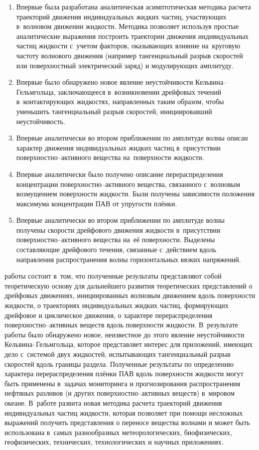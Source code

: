 {\novelty}
\begin{enumerate}
  \item Впервые была разработана аналитическая асимптотическая методика расчета траекторий движения индивидуальных жидких частиц, участвующих в~волновом движении жидкости. Методика позволяет используя простые аналитические выражения построить траектории движения индивидуальных частиц жидкости с~учетом  факторов, оказывающих влияние на~круговую частоту волнового движения (например тангенциальный разрыв скоростей или поверхностный электрический заряд) и модулирующих амплитуду.
  \item Впервые было обнаружено новое явление неустойчивости Кельвина--Гельмгольца, заключающееся в~возникновении дрейфовых течений в~контактирующих жидкостях, направленных таким образом, чтобы уменьшить тангенциальный разрыв скоростей, инициировавший неустойчивость.
  \item Впервые аналитически во втором приближении по амплитуде волны описан характер движения индивидуальных жидких частиц в~присутствии поверхностно--активного вещества на~поверхности жидкости.
  \item Впервые аналитически было получено описание перераспределения  концентрации поверхностно--активного вещества, связанного с~волновым возмущением поверхности жидкости. Были получены зависимости положения максимума концентрации ПАВ от упругости плёнки.
  \item Впервые аналитически во втором приближении по амплитуде волны получены скорости дрейфового движения жидкости в~присутствии поверхностно--активного вещества на~её поверхности. Выделены составляющие дрейфового течения, связанные с~действием вдоль направления распространения волны горизонтальных вязких напряжений. 
\end{enumerate}

{\influence} работы состоит в~том, что полученные результаты представляют собой теоретическую основу для дальнейшего развития теоретических представлений о дрейфовых движениях, инициированных волновым движением вдоль поверхности жидкости, о траекториях индивидуальных жидких частиц, формирующих дрейфовое и циклическое движения, о характере перераспределения поверхностно--активных веществ вдоль поверхности жидкости. В~результате работы было обнаружено новое, неизвестное до этого явление неустойчивости Кельвина--Гельмгольца, которое представляет интерес для приложений,  имеющих дело с~системой двух жидкостей, испытывающих тангенциальный разрыв скоростей вдоль границы раздела. Полученные результаты по определению характера перераспределения плёнки ПАВ вдоль поверхности жидкости могут быть применены в~задачах мониторинга и прогнозирования распространения нефтяных разливов (и других поверхностно--активных веществ) в~мировом океане. В~работе развита новая методика расчета траекторий движения индивидуальных частиц жидкости, которая позволяет при помощи несложных выражений получить представления о переносе вещества волнами и может быть использована в~самых разнообразных метеорологических, биофизических, геофизических, технических, технологических и научных приложениях. 

